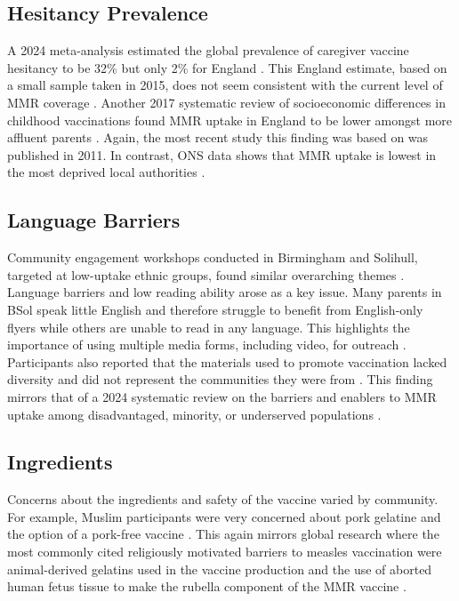 \documentclass{article}
\begin{document}
\subsection{Hesitancy Prevalence}
A 2024 meta-analysis estimated the global prevalence of caregiver vaccine hesitancy to be 32\% but only 2\% for England \cite{maamor2024prevalence}. This England estimate, based on a small sample taken in 2015, does not seem consistent with the current level of MMR coverage \cite{CAMPBELL20172979}. Another 2017 systematic review of socioeconomic differences in childhood vaccinations found MMR uptake in England to be lower amongst more affluent parents \cite{bocquier2017socioeconomic}. Again, the most recent study this finding was based on was published in 2011. In contrast, ONS data shows that MMR uptake is lowest in the most deprived local authorities \cite{FTips}.

\subsection{Language Barriers}
Community engagement workshops conducted in Birmingham and Solihull, targeted at low-uptake ethnic groups, found similar overarching themes \cite{bissett_measles_soft_intelligence_2024, palmer_birmingham_measles_engagement_2024, smbc_community_engagement_learning_2025}. Language barriers and low reading ability arose as a key issue. Many parents in BSol speak little English and therefore struggle to benefit from English-only flyers while others are unable to read in any language. This highlights the importance of using multiple media forms, including video, for outreach \cite{palmer_birmingham_measles_engagement_2024, smbc_community_engagement_learning_2025}. Participants also reported that the materials used to promote vaccination lacked diversity and did not represent the communities they were from \cite{palmer_birmingham_measles_engagement_2024}. This finding mirrors that of a 2024 systematic review on the barriers and enablers to MMR uptake among disadvantaged, minority, or underserved populations \cite{essa2024understanding}.

\subsection{Ingredients}
Concerns about the ingredients and safety of the vaccine varied by community. For example, Muslim participants were very concerned about pork gelatine and the option of a pork-free vaccine \cite{palmer_birmingham_measles_engagement_2024, smbc_community_engagement_learning_2025}. This again mirrors global research where the most commonly cited religiously motivated barriers to measles vaccination were animal-derived gelatins used in the vaccine production and the use of aborted human fetus tissue to make the rubella component of the MMR vaccine \cite{wombwell2015religious}.
\end{document}
